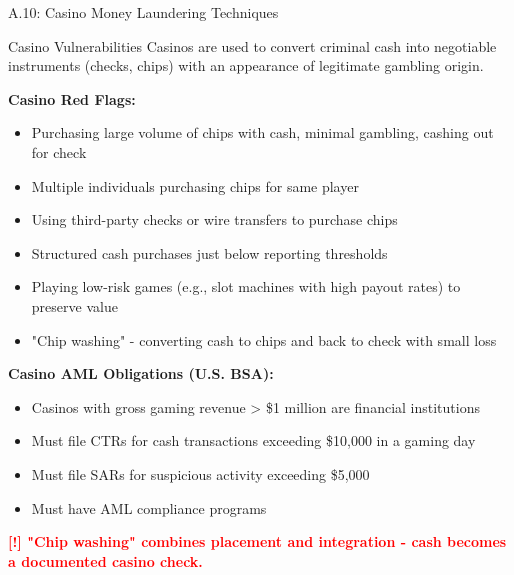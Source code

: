 \documentclass[11pt,a4paper]{beamer}
\newcommand{\redflag}[1]{\textcolor{red}{\textbf{[!] #1}}}
\begin{document}
	\begin{frame}{A.10: Casino Money Laundering Techniques}
		\begin{block}{Casino Vulnerabilities}
			Casinos are used to convert criminal cash into negotiable instruments (checks, chips) with an appearance of legitimate gambling origin.
		\end{block}
		\textbf{Casino Red Flags:}
		\begin{itemize}
			\item Purchasing large volume of chips with cash, minimal gambling, cashing out for check
			\item Multiple individuals purchasing chips for same player
			\item Using third-party checks or wire transfers to purchase chips
			\item Structured cash purchases just below reporting thresholds
			\item Playing low-risk games (e.g., slot machines with high payout rates) to preserve value
			\item "Chip washing" - converting cash to chips and back to check with small loss
		\end{itemize}
		\textbf{Casino AML Obligations (U.S. BSA):}
		\begin{itemize}
			\item Casinos with gross gaming revenue > \$1 million are financial institutions
			\item Must file CTRs for cash transactions exceeding \$10,000 in a gaming day
			\item Must file SARs for suspicious activity exceeding \$5,000
			\item Must have AML compliance programs
		\end{itemize}
		\redflag{"Chip washing" combines placement and integration - cash becomes a documented casino check.}
	\end{frame}
	
\end{document}
